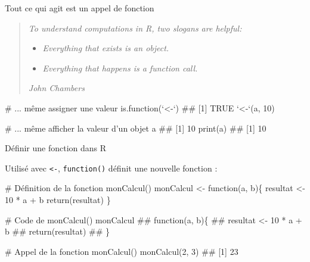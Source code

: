 \documentclass[12pt,handout,ignorenonframetext,]{beamer}
\newenvironment{Shaded}{}{}
\newcommand{\KeywordTok}[1]{\textcolor[rgb]{0.00,0.00,1.00}{{#1}}}
\newcommand{\DataTypeTok}[1]{{#1}}
\newcommand{\DecValTok}[1]{{#1}}
\newcommand{\StringTok}[1]{\textcolor[rgb]{0.00,0.50,0.50}{{#1}}}
\newcommand{\CommentTok}[1]{\textcolor[rgb]{0.00,0.50,0.00}{{#1}}}
\newcommand{\NormalTok}[1]{{#1}}
\renewenvironment{Shaded}{\begin{snugshade}}{\end{snugshade}}
\begin{document}
\begin{frame}[fragile]{\og Tout ce qui agit est un appel de fonction
\fg{}}

\begin{quote}
\emph{To understand computations in R, two slogans are helpful:}

\begin{itemize}
\item
  \emph{Everything that exists is an object.}
\item
  \emph{Everything that happens is a function call.}
\end{itemize}

\emph{John Chambers}
\end{quote}

\pause \footnotesize

\begin{Shaded}
\begin{Highlighting}[]
\CommentTok{# ... même assigner une valeur}
\KeywordTok{is.function}\NormalTok{(}\StringTok{`}\DataTypeTok{<-}\StringTok{`}\NormalTok{)}
  \NormalTok{## [1] TRUE}
\StringTok{`}\DataTypeTok{<-}\StringTok{`}\NormalTok{(a, }\DecValTok{10}\NormalTok{)}

\CommentTok{# ... même afficher la valeur d'un objet}
\NormalTok{a}
  \NormalTok{## [1] 10}
\KeywordTok{print}\NormalTok{(a)}
  \NormalTok{## [1] 10}
\end{Highlighting}
\end{Shaded}

\end{frame}

\begin{frame}[fragile]{Définir une fonction dans R}

Utilisé avec \texttt{\textless{}-}, \texttt{function()} définit une
nouvelle fonction :

\pause \footnotesize

\begin{Shaded}
\begin{Highlighting}[]
\CommentTok{# Définition de la fonction monCalcul()}
\NormalTok{monCalcul <-}\StringTok{ }\NormalTok{function(a, b)\{}
  \NormalTok{resultat <-}\StringTok{ }\DecValTok{10} \NormalTok{*}\StringTok{ }\NormalTok{a +}\StringTok{ }\NormalTok{b}
  \KeywordTok{return}\NormalTok{(resultat)}
\NormalTok{\}}

\CommentTok{# Code de monCalcul()}
\NormalTok{monCalcul}
  \NormalTok{## function(a, b)\{}
  \NormalTok{##   resultat <- 10 * a + b}
  \NormalTok{##   return(resultat)}
  \NormalTok{## \}}

\CommentTok{# Appel de la fonction monCalcul()}
\KeywordTok{monCalcul}\NormalTok{(}\DecValTok{2}\NormalTok{, }\DecValTok{3}\NormalTok{)}
  \NormalTok{## [1] 23}
\end{Highlighting}
\end{Shaded}

\end{frame}
\end{document}
